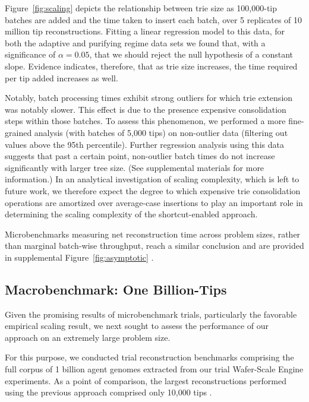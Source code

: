 Figure~\ref{fig:scaling} depicts the relationship between trie size as 100,000-tip batches are added and the time taken to insert each batch, over 5 replicates of 10 million tip reconstructions.
Fitting a linear regression model to this data, for both the adaptive and purifying regime data sets we found that, with a significance of $\alpha = 0.05$, that we should reject the null hypothesis of a constant slope.
Evidence indicates, therefore, that as trie size increases, the time required per tip added increases as well.

Notably, batch processing times exhibit strong outliers for which trie extension was notably slower.
This effect is due to the presence expensive consolidation steps within those batches.
To assess this phenomenon, we performed a more fine-grained analysis (with batches of 5,000 tips) on non-outlier data (filtering out values above the 95th percentile).
Further regression analysis using this data suggests that past a certain point, non-outlier batch times do not increase significantly with larger tree size.
(See supplemental materials \citep{supplemental} for more information.)
In an analytical investigation of scaling complexity, which is left to future work, we therefore expect the degree to which expensive trie consolidation operations are amortized over average-case insertions to play an important role in determining the scaling complexity of the shortcut-enabled approach.

Microbenchmarks measuring net reconstruction time across problem sizes, rather than marginal batch-wise throughput, reach a similar conclusion and are provided in supplemental Figure~\ref{fig:asymptotic} \citep{supplemental}.

\subsection{Macrobenchmark: One Billion-Tips}



Given the promising results of microbenchmark trials, particularly the favorable empirical scaling result, we next sought to assess the performance of our approach on an extremely large problem size.

For this purpose, we conducted trial reconstruction benchmarks comprising the full corpus of 1 billion agent genomes extracted from our trial Wafer-Scale Engine experiments.
As a point of comparison, the largest reconstructions performed using the previous approach comprised only 10,000 tips \citep{moreno2024trackable}.


